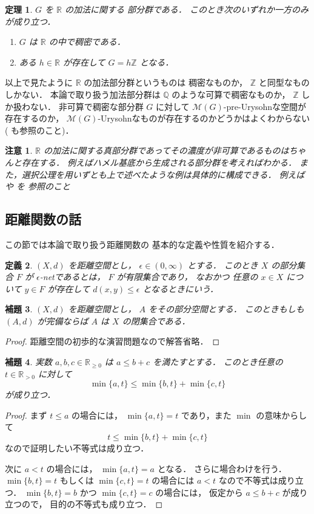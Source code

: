 \documentclass[leqno, 12pt]{jsarticle}
\newtheorem{thm}{定理}[section]
\newtheorem{lem}[thm]{補題}
\newtheorem{df}[thm]{定義}
\newtheorem*{rmk}{注意}
\newcommand{\zz}{\mathbb{Z}}
\newcommand{\qq}{\mathbb{Q}}
\newcommand{\rr}{\mathbb{R}}
\begin{document}
\begin{thm}\label{thm:hanasi:gr}
$G$
を
$\rr$
の加法に関する
部分群である．
このとき次のいずれか一方のみが成り立つ．
\begin{enumerate}
\item 
$G$
は
$\rr$
の中で稠密である．


\item 
ある
$h\in \rr$
が存在して
$G=h\zz$
となる．
\end{enumerate}
\end{thm}
以上で見たように
$\rr$
の加法部分群というものは
稠密なものか，
$\zz$
と同型なものしかない．
本論で取り扱う加法部分群は
$\qq$
のような可算で稠密なものか，
$\zz$
しか扱わない．
非可算で稠密な部分群
$G$
に対して
$\mathscr{M}(G)$-pre-Urysohnな空間が存在するのか，
$\mathscr{M}(G)$-Urysohnなものが存在するのかどうかはよくわからない
(\cite{Sau}
も参照のこと)．

\begin{rmk}
$\rr$
の加法に関する真部分群であってその濃度が非可算であるものはちゃんと存在する．
例えばハメル基底から生成される部分群を考えればわかる．
また，選択公理を用いずとも上で述べたような例は具体的に構成できる．
例えば 
\cite{Neumann}
や
\cite{Mathoverflaw}
を
参照のこと
\end{rmk}


\subsection{距離関数の話}
この節では本論で取り扱う距離関数の
基本的な定義や性質を紹介する．

\begin{df}\label{df:hanasi:net}
$(X, d)$
を距離空間とし，
$\epsilon \in (0, \infty)$
とする．
このとき
$X$
の部分集合
$F$
が
$\epsilon$-netであるとは，
$F$
が有限集合であり，
なおかつ
任意の
$x\in X$
について
$y\in F$
が存在して
$d(x, y)\le \epsilon$
となるときにいう．
\end{df}

\begin{lem}\label{lem:hanasi:comp}
$(X, d)$
を距離空間とし，
$A$
をその部分空間とする．
このときもしも
$(A, d)$
が完備ならば
$A$
は
$X$
の閉集合である．
\end{lem}
\begin{proof}
距離空間の初歩的な演習問題なので解答省略．
\end{proof}
\begin{lem}\label{lem:hansi:minlem}
実数
$a, b, c\in \rr_{\ge 0}$
は
$a\le b+c$
を満たすとする．
このとき任意の
$t\in \rr_{>0}$
に対して
\[
\min\{a, t\}\le \min\{b, t\}+\min\{c, t\}
\]
が成り立つ．
\end{lem}
\begin{proof}
まず
$t\le a$
の場合には，
$\min\{a, t\}=t$
であり，また
$\min$
の意味からして
\[
t\le \min\{b, t\}+\min\{c, t\}
\]
なので証明したい不等式は成り立つ．

次に
$a<t$
の場合には，
$\min\{a, t\}=a$
となる．
さらに場合わけを行う．
$\min\{b, t\}=t$
 もしくは
 $\min\{c, t\}=t$
 の場合には
$a<t$
なので不等式は成り立つ．
$\min\{b, t\}=b$ 
かつ
$\min\{c, t\}=c$
の場合には，
仮定から
$a\le b+c$
が成り立つので，
目的の不等式も成り立つ．
\end{proof}
\end{document}

